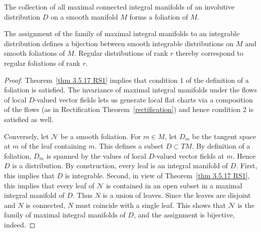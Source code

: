 \begin{thm}\label{prop 3.5.21 RS1}
    The collection of all maximal connected integral manifolds of an involutive distribution $D$ on a smooth manifold $M$ forms a foliation of $M$.
    
    The assignment of the family of maximal integral manifolds to an integrable distribution defines a bijection between smooth integrable distributions on $M$ and smooth foliations of $M$. Regular distributions of rank $r$ thereby correspond to regular foliations of rank $r$.
\end{thm}
\begin{proof}
    Theorem~\ref{thm 3.5.17 RS1} implies that condition 1 of the definition of a foliation is satisfied. The invariance of maximal integral manifolds under the flows of local $D$-valued vector fields lets us generate local flat charts via a composition of the flows (as in Rectification Theorem~\ref{rectification}) and hence condition 2 is satisfied as well. 

    Conversely, let $\mathcal{N}$ be a smooth foliation. For $m\in M$, let $D_m$ be the tangent space at $m$ of the leaf containing $m$. This defines a subset $D\subset TM$. By definition of a foliation, $D_m$ is spanned by the values of local $D$-valued vector fields at $m$. Hence $D$ is a distribution. By construction, every leaf is an integral manifold of $D$. First, this implies that $D$ is integrable. Second, in view of Theorem~\ref{thm 3.5.17 RS1}, this implies that every leaf of $\mathcal{N}$ is contained in an open subset in a maximal integral manifold of $D$. Thus $N$ is a union of leaves. Since the leaves are disjoint and $N$ is connected, $N$ must coincide with a single leaf. This shows that $\mathcal{N}$ is the family of maximal integral manifolds of $D$, and the assignment is bijective, indeed.
\end{proof}



